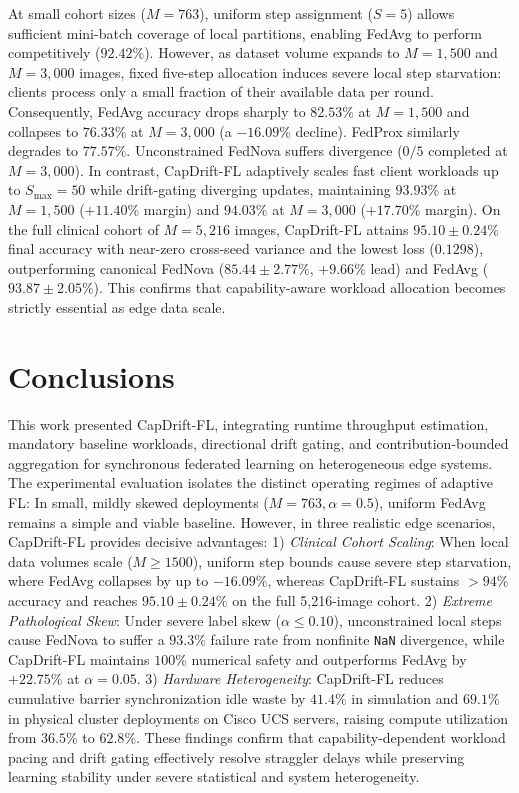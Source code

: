 \documentclass[conference]{IEEEtran}
\begin{document}
At small cohort sizes ($M=763$), uniform step assignment ($S=5$) allows sufficient mini-batch coverage of local partitions, enabling FedAvg to perform competitively ($92.42\%$). However, as dataset volume expands to $M=1,500$ and $M=3,000$ images, fixed five-step allocation induces severe local step starvation: clients process only a small fraction of their available data per round. Consequently, FedAvg accuracy drops sharply to $82.53\%$ at $M=1,500$ and collapses to $76.33\%$ at $M=3,000$ (a $-16.09\%$ decline). FedProx similarly degrades to $77.57\%$. Unconstrained FedNova suffers divergence ($0/5$ completed at $M=3,000$).
In contrast, CapDrift-FL adaptively scales fast client workloads up to $S_{\max}=50$ while drift-gating diverging updates, maintaining $93.93\%$ at $M=1,500$ ($+11.40\%$ margin) and $94.03\%$ at $M=3,000$ ($+17.70\%$ margin). On the full clinical cohort of $M=5,216$ images, CapDrift-FL attains $\mathbf{95.10\pm0.24\%}$ final accuracy with near-zero cross-seed variance and the lowest loss ($0.1298$), outperforming canonical FedNova ($85.44\pm2.77\%$, $+9.66\%$ lead) and FedAvg ($93.87\pm2.05\%$). This confirms that capability-aware workload allocation becomes strictly essential as edge data scale.

\section{Conclusions}\label{sec:conclusion}
This work presented CapDrift-FL, integrating runtime throughput estimation, mandatory baseline workloads, directional drift gating, and contribution-bounded aggregation for synchronous federated learning on heterogeneous edge systems. The experimental evaluation isolates the distinct operating regimes of adaptive FL:
In small, mildly skewed deployments ($M=763, \alpha=0.5$), uniform FedAvg remains a simple and viable baseline. However, in three realistic edge scenarios, CapDrift-FL provides decisive advantages:
1) \textit{Clinical Cohort Scaling}: When local data volumes scale ($M \ge 1500$), uniform step bounds cause severe step starvation, where FedAvg collapses by up to $-16.09\%$, whereas CapDrift-FL sustains $>94\%$ accuracy and reaches $95.10\pm0.24\%$ on the full 5,216-image cohort.
2) \textit{Extreme Pathological Skew}: Under severe label skew ($\alpha \le 0.10$), unconstrained local steps cause FedNova to suffer a $93.3\%$ failure rate from nonfinite \texttt{NaN} divergence, while CapDrift-FL maintains $100\%$ numerical safety and outperforms FedAvg by $+22.75\%$ at $\alpha=0.05$.
3) \textit{Hardware Heterogeneity}: CapDrift-FL reduces cumulative barrier synchronization idle waste by $41.4\%$ in simulation and $69.1\%$ in physical cluster deployments on Cisco UCS servers, raising compute utilization from $36.5\%$ to $62.8\%$.
These findings confirm that capability-dependent workload pacing and drift gating effectively resolve straggler delays while preserving learning stability under severe statistical and system heterogeneity.
\end{document}
